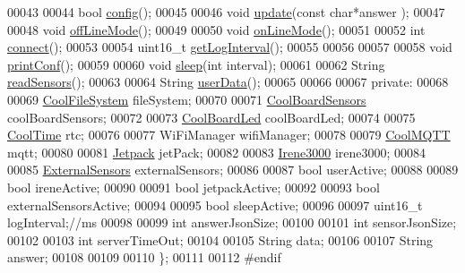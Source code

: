 \begin{DoxyCode}
00043     
00044     \textcolor{keywordtype}{bool} \hyperlink{class_cool_board_a583a874c09c07e70a6eb9229fc4beddb}{config}();
00045 
00046     \textcolor{keywordtype}{void} \hyperlink{class_cool_board_a8612756d3f73198cdde857a66f0fe690}{update}(\textcolor{keyword}{const} \textcolor{keywordtype}{char}*answer );
00047 
00048     \textcolor{keywordtype}{void} \hyperlink{class_cool_board_ae6b5e1274d760462290192acea4adca8}{offLineMode}();
00049 
00050     \textcolor{keywordtype}{void} \hyperlink{class_cool_board_aa0bbc4bc605e35618d18e68795c61363}{onLineMode}();
00051 
00052     \textcolor{keywordtype}{int} \hyperlink{class_cool_board_a519de78b807f8ec6463ff484eb925918}{connect}();
00053 
00054     uint16\_t \hyperlink{class_cool_board_aaa24480b273fc095a1356a589c333781}{getLogInterval}();
00055     
00056 
00057 
00058     \textcolor{keywordtype}{void} \hyperlink{class_cool_board_a486507b8f0981d3cc671ed31c2145755}{printConf}();
00059 
00060     \textcolor{keywordtype}{void} \hyperlink{class_cool_board_a5d0c8ff93b615efd676be432de9f164a}{sleep}(\textcolor{keywordtype}{int} interval);
00061 
00062     String \hyperlink{class_cool_board_ad03abdce2e65f520bbf2cff0f2d083cf}{readSensors}();
00063     
00064     String \hyperlink{class_cool_board_ae7358fb6e623cfc81b775f5f1734909b}{userData}();
00065 
00066 
00067 \textcolor{keyword}{private}:
00068 
00069     \hyperlink{class_cool_file_system}{CoolFileSystem} fileSystem; 
00070 
00071     \hyperlink{class_cool_board_sensors}{CoolBoardSensors} coolBoardSensors;
00072 
00073     \hyperlink{class_cool_board_led}{CoolBoardLed} coolBoardLed;
00074 
00075     \hyperlink{class_cool_time}{CoolTime} rtc;
00076 
00077     WiFiManager wifiManager;
00078 
00079     \hyperlink{class_cool_m_q_t_t}{CoolMQTT} mqtt;
00080 
00081     \hyperlink{class_jetpack}{Jetpack} jetPack;
00082 
00083     \hyperlink{class_irene3000}{Irene3000} irene3000;
00084 
00085     \hyperlink{class_external_sensors}{ExternalSensors} externalSensors;
00086 
00087     \textcolor{keywordtype}{bool} userActive;
00088 
00089     \textcolor{keywordtype}{bool} ireneActive;
00090 
00091     \textcolor{keywordtype}{bool} jetpackActive;
00092 
00093     \textcolor{keywordtype}{bool} externalSensorsActive;     
00094 
00095     \textcolor{keywordtype}{bool} sleepActive;   
00096 
00097     uint16\_t logInterval;\textcolor{comment}{//ms}
00098 
00099     \textcolor{keywordtype}{int} answerJsonSize;
00100     
00101     \textcolor{keywordtype}{int} sensorJsonSize;
00102 
00103     \textcolor{keywordtype}{int} serverTimeOut;
00104 
00105     String data;
00106 
00107     String answer;
00108 
00109 
00110 \};
00111 
00112 \textcolor{preprocessor}{#endif}
\end{DoxyCode}
